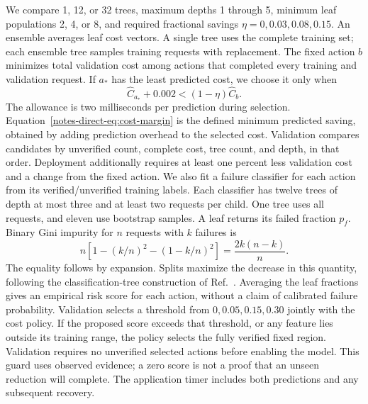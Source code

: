 \documentclass[11pt,a4paper]{article}
\begin{document}
We compare 1, 12, or 32 trees, maximum depths 1 through 5, minimum leaf populations 2, 4, or 8, and required fractional savings $\eta=0,0.03,0.08,0.15$. An ensemble averages leaf cost vectors. A single tree uses the complete training set; each ensemble tree samples training requests with replacement. The fixed action $b$ minimizes total validation cost among actions that completed every training and validation request. If $a_*$ has the least predicted cost, we choose it only when
\begin{equation}
 \widehat C_{a_*}+0.002 < (1-\eta)\widehat C_b.
 \label{notes-direct-eq:cost-margin}
\end{equation}
The allowance is two milliseconds per prediction during selection. Equation~\eqref{notes-direct-eq:cost-margin} is the defined minimum predicted saving, obtained by adding prediction overhead to the selected cost. Validation compares candidates by unverified count, complete cost, tree count, and depth, in that order. Deployment additionally requires at least one percent less validation cost and a change from the fixed action. We also fit a failure classifier for each action from its verified/unverified training labels. Each classifier has twelve trees of depth at most three and at least two requests per child. One tree uses all requests, and eleven use bootstrap samples. A leaf returns its failed fraction $p_f$. Binary Gini impurity for $n$ requests with $k$ failures is
\begin{equation}
 n\left[1-(k/n)^2-(1-k/n)^2\right]=\frac{2k(n-k)}{n}.
 \label{notes-direct-eq:failure-gini}
\end{equation}
The equality follows by expansion. Splits maximize the decrease in this quantity, following the classification-tree construction of Ref.~\cite{CART1984}. Averaging the leaf fractions gives an empirical risk score for each action, without a claim of calibrated failure probability. Validation selects a threshold from $0,0.05,0.15,0.30$ jointly with the cost policy. If the proposed score exceeds that threshold, or any feature lies outside its training range, the policy selects the fully verified fixed region. Validation requires no unverified selected actions before enabling the model. This guard uses observed evidence; a zero score is not a proof that an unseen reduction will complete. The application timer includes both predictions and any subsequent recovery.
\end{document}
